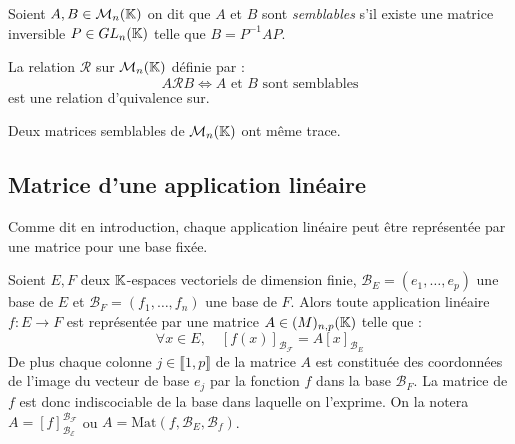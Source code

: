 \begin{definition}
    Soient $A,B \in  \mathcal{M}_n(\mathbb{K})$ on dit que $A$ et $B$ sont \emph{semblables} s'il 
    existe une matrice inversible $ P \in GL_n(\mathbb{K})$ telle que $B = P^{-1}AP$. 
\end{definition}

\begin{remark}
    La relation $ \mathcal{R}$ sur $\mathcal{M}_n(\mathbb{K})$ définie par : 
        \[ A \mathcal{R} B \iff A \text{ et } B \text{ sont semblables} \] 
    est une relation d'quivalence sur. 
\end{remark}

\begin{proposition}
    Deux matrices semblables de $ \mathcal{M}_n(\mathbb{K})$ ont même trace. 
\end{proposition}

\subsection{Matrice d'une application linéaire}

Comme dit en introduction, chaque application linéaire peut être représentée par une 
matrice pour une base fixée. 


\begin{theorem}
    Soient $E,F$ deux $\mathbb{K}$-espaces vectoriels de dimension finie, $ \mathcal{B}_E = (e_1, \dots, e_p)$ une base de $E$ 
    et $ \mathcal{B}_F = (f_1, \dots, f_n)$ une base de $F$. 
    Alors toute application linéaire $f : E \longrightarrow F$ est représentée par une matrice $A \in \mathcal(M)_{n,p}(\mathbb{K})$
    telle que : 
        \[ \forall x \in E, \quad \left[f(x)\right]_\mathcal{B_F} = A [x]_{ \mathcal{B}_E} \] 
    De plus chaque colonne $j \in \llbracket 1, p \rrbracket$ de la matrice $A$ est constituée des coordonnées de l'image 
    du vecteur de base $e_j$ par la fonction $f$ dans la base $ \mathcal{B}_F$. 
    La matrice de $f$ est donc indiscociable de la base dans laquelle on l'exprime. On la notera $A = [f]_{\mathcal{B_E}}^{\mathcal{B_F}}$ 
    ou $A = \text{Mat}(f, \mathcal{B}_E, \mathcal{B}_f)$. 
\end{theorem}

